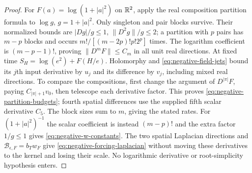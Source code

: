 \begin{proof}
For $F(a)=\log(1+|a|^2)$ on $\mathbb R^2$, apply the real composition
partition formula to $\log g$, $g=1+|a|^2$.
Only singleton and pair blocks survive. Their normalized bounds are
$|Dg|/g\le1$, $\|D^2g\|/g\le2$; a partition with $p$ pairs has
$m-p$ blocks and occurs $m!/[(m-2p)!p!2^p]$ times.
The logarithm coefficient is $(m-p-1)!$, proving
$\|D^mF\|\le C_m$ in all unit real directions.
At fixed time $S_H=\log(e^2)+F(H/e)$.
Holomorphy and \eqref{eq:negative-field-jets} bound its $j$th input
derivative by $u_j$ and its difference by $v_j$, including mixed real
directions. To compare the compositions, first change the argument of
$D^{|\pi|}F$, paying $C_{|\pi|+1}v_0$, then telescope each derivative
factor. This proves \eqref{eq:negative-partition-budgets}; fourth
spatial differences use the supplied fifth scalar derivative $C_5$.
The block sizes sum to $m$, giving the stated rates.
For $(1+|a|^2)^{-1}$ the scalar coefficient is instead $(m-p)!$
and the extra factor $1/g\le1$ gives \eqref{eq:negative-w-constants}.
The two spatial Laplacian directions and
$\mathcal B_{\epsilon,F}=b_Tw_F$ give
\eqref{eq:negative-forcing-laplacian} without moving these derivatives
to the kernel and losing their scale. No logarithmic derivative or
root-simplicity hypothesis enters.
\end{proof}

